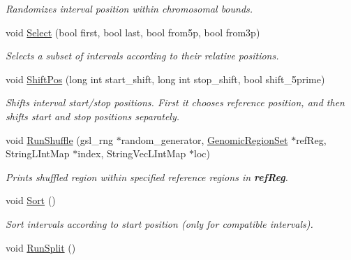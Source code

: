 \begin{CompactItemize}
\begin{CompactList}\small\item\em Randomizes interval position within chromosomal bounds. \item\end{CompactList}\item 
\hypertarget{classGenomicRegionBED_dec7408315765bbdb21465a26400422b}{
void \hyperlink{classGenomicRegionBED_dec7408315765bbdb21465a26400422b}{Select} (bool first, bool last, bool from5p, bool from3p)}
\label{classGenomicRegionBED_dec7408315765bbdb21465a26400422b}

\begin{CompactList}\small\item\em Selects a subset of intervals according to their relative positions. \item\end{CompactList}\item 
void \hyperlink{classGenomicRegionBED_97d00cb29eb1f379b9e6ee17197530c7}{ShiftPos} (long int start\_\-shift, long int stop\_\-shift, bool shift\_\-5prime)
\begin{CompactList}\small\item\em Shifts interval start/stop positions. First it chooses reference position, and then shifts start and stop positions separately. \item\end{CompactList}\item 
\hypertarget{classGenomicRegionBED_f3793387aa335bf68042f9245bc5992d}{
void \hyperlink{classGenomicRegionBED_f3793387aa335bf68042f9245bc5992d}{RunShuffle} (gsl\_\-rng $\ast$random\_\-generator, \hyperlink{classGenomicRegionSet}{GenomicRegionSet} $\ast$refReg, StringLIntMap $\ast$index, StringVecLIntMap $\ast$loc)}
\label{classGenomicRegionBED_f3793387aa335bf68042f9245bc5992d}

\begin{CompactList}\small\item\em Prints shuffled region within specified reference regions in {\bf refReg}. \item\end{CompactList}\item 
\hypertarget{classGenomicRegionBED_fd1a61c04f76782abdc83074ae0f7bd3}{
void \hyperlink{classGenomicRegionBED_fd1a61c04f76782abdc83074ae0f7bd3}{Sort} ()}
\label{classGenomicRegionBED_fd1a61c04f76782abdc83074ae0f7bd3}

\begin{CompactList}\small\item\em Sort intervals according to start position (only for compatible intervals). \item\end{CompactList}\item 
\hypertarget{classGenomicRegionBED_bd3b8e4969c2ff2639eb344de7b224f9}{
void \hyperlink{classGenomicRegionBED_bd3b8e4969c2ff2639eb344de7b224f9}{RunSplit} ()}
\label{classGenomicRegionBED_bd3b8e4969c2ff2639eb344de7b224f9}


\end{CompactItemize}
